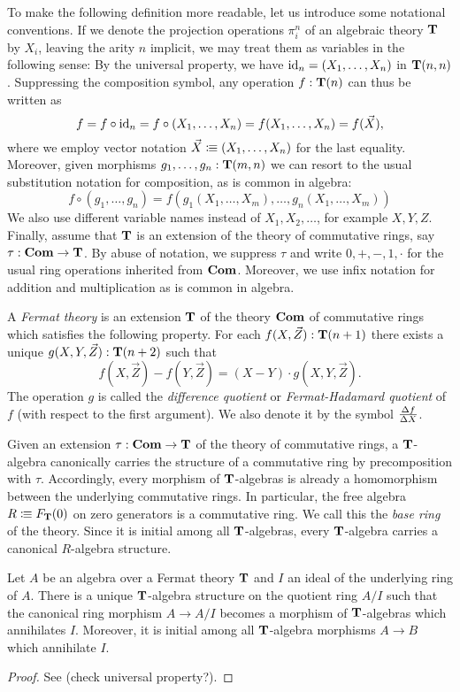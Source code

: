 {To make the following definition more readable, let us introduce some notational conventions.
If we denote the projection operations \(\pi^n_i\) of an algebraic theory \(\mathbf{T}\) by \(X_i\), leaving the arity \(n\) implicit, we may treat them as {variables} in the following sense:
By the universal property, we have \(\mathrm{id}_n = (X_1,\dots,X_n)\) in \(\mathbf{T}(n,n)\).
Suppressing the composition symbol, any operation \(f : \mathbf{T}(n)\) can thus be written as
\[f = f\circ \mathrm{id}_n = f \circ (X_1,\dots,X_n) = f(X_1,\dots,X_n) = f(\vec X),\]
where we employ vector notation \(\vec X \vcentcolon\mspace{-1.2mu}\equiv (X_1,\dots,X_n)\) for the last equality.
Moreover, given morphisms \(g_1,\dots,g_n : \mathbf{T}(m,n)\) we can resort to the usual substitution notation for composition, as is common in algebra:
\[f \circ (g_1,\dots,g_n) = f(g_1(X_1,\dots,X_m),\dots,g_n(X_1,\dots,X_m))\]
We also use different variable names instead of \(X_1,X_2,\dots\), for example \(X,Y,Z\).
Finally, assume that \(\mathbf{T}\) is an extension of the theory of commutative rings, say \(\tau : \mathbf{Com} \to \mathbf{T}\).
By abuse of notation, we suppress \(\tau\) and write \(0,+,-,1,\cdot\) for the usual ring operations inherited from \(\mathbf{Com}\).
Moreover, we use infix notation for addition and multiplication as is common in algebra.

\begin{definition}
  A \emph{Fermat theory} is an extension \(\mathbf{T}\) of the theory \(\mathbf{Com}\) of commutative rings which satisfies the following property.
  For each \(f(X,\vec{Z}) : \mathbf{T}(n+1)\) there exists a unique \(g(X,Y,\vec{Z}) : \mathbf{T}(n+2)\) such that
  \[
    f(X,\vec{Z}) - f(Y,\vec{Z}) = (X-Y)\cdot g(X,Y,\vec{Z}).
  \]
  The operation \(g\) is called the \emph{difference quotient} or \emph{Fermat-Hadamard quotient} of \(f\) (with respect to the first argument).
  We also denote it by the symbol \(\frac{\Delta{f}}{\Delta{X}}\).
\end{definition}

Given an extension \(\tau:\mathbf{Com}\to\mathbf{T}\) of the theory of commutative rings, a \(\mathbf{T}\)-algebra canonically carries the structure of a commutative ring by precomposition with \(\tau\).
Accordingly, every morphism of \(\mathbf{T}\)-algebras is already a homomorphism between the underlying commutative rings.
In particular, the free algebra \(R\vcentcolon\mspace{-1.2mu}\equiv F_{\mathbf{T}}(0)\) on zero generators is a commutative ring.
We call this the \emph{base ring} of the theory.
Since it is initial among all \(\mathbf{T}\)-algebras, every \(\mathbf{T}\)-algebra carries a canonical \(R\)-algebra structure.

\begin{proposition}
  Let \(A\) be an algebra over a Fermat theory \(\mathbf{T}\) and \(I\) an ideal of the underlying ring of \(A\).
  There is a unique \(\mathbf{T}\)-algebra structure on the quotient ring \(A/I\) such that the canonical ring morphism \(A \to A/I\) becomes a morphism of \(\mathbf{T}\)-algebras which annihilates \(I\).
  Moreover, it is initial among all \(\mathbf{T}\)-algebra morphisms \(A\to B\) which annihilate \(I\).
\end{proposition}
\begin{proof}
  See \cite[Proposition 1.2]{DK84} (check universal property?).
\end{proof}

}
